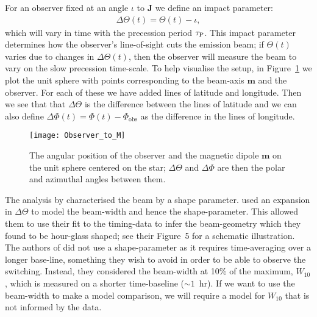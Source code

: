 \documentclass[../full_thesis/full_thesis.tex]{subfiles}
\begin{document}
For an observer fixed at an angle $\iota$ to $\textbf{J}$ we define an impact parameter:
\begin{align}
\label{eqn:Delta_Theta_definition}
\Delta\Theta(t) = \Theta(t) - \iota ,
\end{align}
which will vary in time with the precession period $\tau_{\mathrm{P}}$.  This impact
parameter determines how the observer's line-of-sight cuts the emission beam;
if $\Theta(t)$ varies due to changes in $\Delta\Theta(t)$, then the observer
will measure the beam to vary on the slow precession time-scale. To help visualise the setup, in
Figure~\ref{fig: delta theta delta phi} we plot the unit sphere with points
corresponding to the beam-axis $\mathbf{m}$ and the observer. For each of these
we have added lines of latitude and longitude. Then we see that that
$\Delta\Theta$ is the difference between the lines of latitude and we can also
define $\Delta\Phi(t) = \Phi(t) - \Phi_{\textrm{obs}}$ as the difference in the
lines of longitude.
\begin{figure}
\centering
\texttt{[image: Observer\_to\_M]}
\caption{The angular position of the observer and the magnetic dipole
         $\mathbf{m}$ on the unit sphere centered on the star; $\Delta\Theta$
         and $\Delta\Phi$ are then the polar and azimuthal angles between
         them.}
\label{fig: delta theta delta phi}
\end{figure}


The analysis by \citet{Stairs2000} characterised the beam by a shape parameter.
\citet{Link2001} used an expansion in $\Delta\Theta$ to model the beam-width
and hence the shape-parameter. This allowed them to use their fit to the
timing-data to infer the beam-geometry which they found to be hour-glass
shaped; see their Figure~5 for a schematic illustration.   The authors of
\citet{Lyne2010} did not use a shape-parameter as it requires time-averaging
over a longer base-line, something they wish to avoid in order to be able to
observe the switching. Instead, they considered the beam-width at 10\% of the
maximum, $W_{10}$, which is measured on a shorter time-baseline ($\sim1$~hr).
If we want to use the beam-width to make a model comparison, we will require a
model for $W_{10}$ that is not informed by the data.
\end{document}
